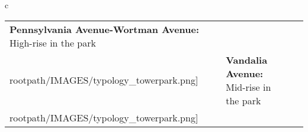 \begin{table}[H]
        \begin{tabular}{c}
        \begin{tabular}{m{1.25in} m{2in} m{.1in} m{1.25in} m{2in}}
\textbf{Pennsylvania Avenue-Wortman Avenue:} {High-rise in the park} & \texttt{[image: \\rootpath/IMAGES/typology\_towerpark.png]} & & \textbf{Vandalia Avenue:} {Mid-rise in the park} & \texttt{[image: \\rootpath/IMAGES/typology\_towerpark.png]}
\end{tabular}\end{tabular}
        \end{table}